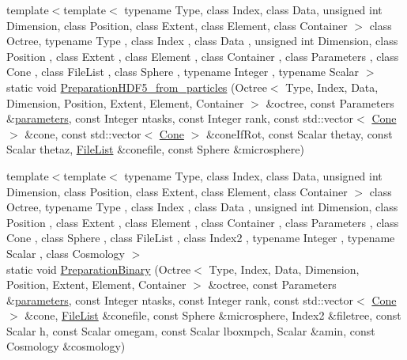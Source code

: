 \begin{DoxyCompactItemize}
{\footnotesize template$<$template$<$ typename Type, class Index, class Data, unsigned int Dimension, class Position, class Extent, class Element, class Container $>$ class Octree, typename Type , class Index , class Data , unsigned int Dimension, class Position , class Extent , class Element , class Container , class Parameters , class Cone , class File\-List , class Sphere , typename Integer , typename Scalar $>$ }\\static void \hyperlink{classCreate__octree_aac249233d95e5afb3c0a10b45d43fe67}{Preparation\-H\-D\-F5\-\_\-from\-\_\-particles} (Octree$<$ Type, Index, Data, Dimension, Position, Extent, Element, Container $>$ \&octree, const Parameters \&\hyperlink{rays_8h_ae1bc8b0b8c8b9f8e4cc61a5cc7c4ce9e}{parameters}, const Integer ntasks, const Integer rank, const std\-::vector$<$ \hyperlink{exceptionCone}{Cone} $>$ \&cone, const std\-::vector$<$ \hyperlink{exceptionCone}{Cone} $>$ \&cone\-If\-Rot, const Scalar thetay, const Scalar thetaz, \hyperlink{exceptionmagrathea_1_1FileList}{File\-List} \&conefile, const Sphere \&microsphere)
\item 
{\footnotesize template$<$template$<$ typename Type, class Index, class Data, unsigned int Dimension, class Position, class Extent, class Element, class Container $>$ class Octree, typename Type , class Index , class Data , unsigned int Dimension, class Position , class Extent , class Element , class Container , class Parameters , class Cone , class Sphere , class File\-List , class Index2 , typename Integer , typename Scalar , class Cosmology $>$ }\\static void \hyperlink{classCreate__octree_a1f4d4fd760e8a78df9b23418e3024974}{Preparation\-Binary} (Octree$<$ Type, Index, Data, Dimension, Position, Extent, Element, Container $>$ \&octree, const Parameters \&\hyperlink{rays_8h_ae1bc8b0b8c8b9f8e4cc61a5cc7c4ce9e}{parameters}, const Integer ntasks, const Integer rank, const std\-::vector$<$ \hyperlink{exceptionCone}{Cone} $>$ \&cone, \hyperlink{exceptionmagrathea_1_1FileList}{File\-List} \&conefile, const Sphere \&microsphere, Index2 \&filetree, const Scalar h, const Scalar omegam, const Scalar lboxmpch, Scalar \&amin, const Cosmology \&cosmology)
\item 

\end{DoxyCompactItemize}
